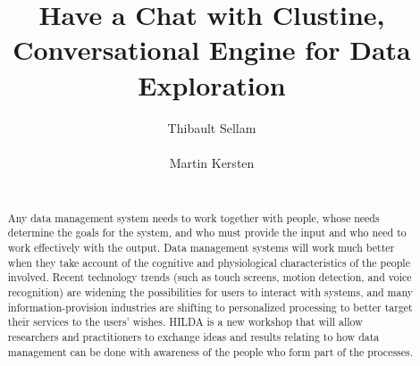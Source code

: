 \documentclass{sig-alternate}
\begin{document}
\title{Have a Chat with Clustine,\\Conversational Engine for Data Exploration}

\author{
\alignauthor
Thibault Sellam\\
       \\
\alignauthor
Martin Kersten\\
       \\
}

\maketitle
\begin{abstract} 
    Any data management system needs to work together with people, whose needs
    determine the goals for the system, and who must provide the input and who
    need to work effectively with the output. Data management systems will work
    much better when they take account of the cognitive and physiological
    characteristics of the people involved. Recent technology trends (such as
    touch screens, motion detection, and voice recognition) are widening the
    possibilities for users to interact with systems, and many
    information-provision industries are shifting to personalized processing to
    better target their services to the users’ wishes. HILDA is a new workshop
    that will allow researchers and practitioners to exchange ideas and results
    relating to how data management can be done with awareness of the people
    who form part of the processes. 
\end{abstract}





\end{document}
